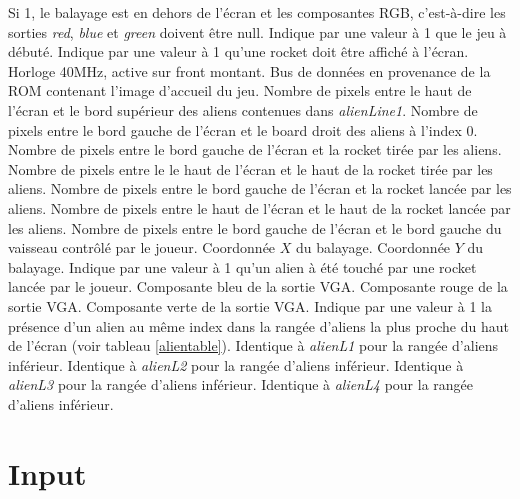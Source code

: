 \documentclass[french]{nakrule}
\begin{document}
\begin{descr}
   Si 1, le balayage est en dehors de l'écran et les
  composantes RGB, c'est-à-dire les sorties \emph{red}, \emph{blue} et
  \emph{green} doivent être null.
   Indique par une valeur à 1 que le jeu à débuté.
   Indique par une valeur à 1 qu'une rocket doit être
  affiché à l'écran.
   Horloge 40MHz, active sur front montant.
   Bus de données en provenance de la ROM contenant
  l'image d'accueil du jeu.
   Nombre de pixels entre le haut de l'écran et le bord
  supérieur des aliens contenues dans \emph{alienLine1}.
   Nombre de pixels entre le bord gauche de l'écran et le
  board droit des aliens à l'index 0.
   Nombre de pixels entre le bord gauche de l'écran et
  la rocket tirée par les aliens.
   Nombre de pixels entre le le haut de l'écran et le
  haut de la rocket tirée par les aliens.
   Nombre de pixels entre le bord gauche de l'écran et la rocket
  lancée par les aliens.
   Nombre de pixels entre le haut de l'écran et le haut de la rocket
  lancée par les aliens.
   Nombre de pixels entre le bord gauche de l'écran et
  le bord gauche du vaisseau contrôlé par le joueur.
   Coordonnée $X$ du balayage.
   Coordonnée $Y$ du balayage.
   Indique par une valeur à 1 qu'un alien à été touché
  par une rocket lancée par le joueur.
   Composante bleu de la sortie VGA.
   Composante rouge de la sortie VGA.
   Composante verte de la sortie VGA.
   Indique par une valeur à 1 la présence d'un alien au même
  index dans la rangée d'aliens la plus proche du haut de l'écran (voir tableau
  \ref{alientable}).
   Identique à \emph{alienL1} pour la rangée d'aliens inférieur.
   Identique à \emph{alienL2} pour la rangée d'aliens inférieur.
   Identique à \emph{alienL3} pour la rangée d'aliens inférieur.
   Identique à \emph{alienL4} pour la rangée d'aliens inférieur.
\end{descr}

\clearpage

\section{Input}
\label{sec:input}
\end{document}
